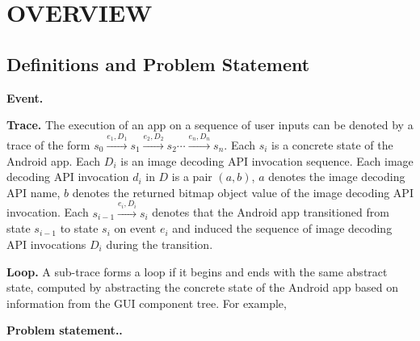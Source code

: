 \section{OVERVIEW}\label{sec:overview}

\subsection{Definitions and Problem Statement}

\noindent\textbf{Event.}

\noindent\textbf{Trace.}
The execution of an app on a sequence of user inputs can be denoted by a trace of the form
$s_0\xrightarrow{e_1, D_1}s_1\xrightarrow{e_2, D_2}s_2 \cdots\xrightarrow{e_n, D_n}s_n$.
Each $s_i$ is a concrete state of the Android app.
Each $D_i$ is an image decoding API invocation sequence. Each image decoding API invocation $d_i$ in $D$ is a pair $(a,b)$, $a$ denotes the image decoding API name, $b$ denotes the returned bitmap object value of the image decoding API invocation.
Each $s_{i-1}\xrightarrow{e_i, D_i}s_i$ denotes that the Android app transitioned from state $s_{i-1}$ to state $s_i$ on event $e_i$ and induced the sequence of image decoding API invocations $D_i$ during the transition.

\noindent\textbf{Loop.}
A sub-trace forms a loop if it begins and ends with the same abstract state, computed by abstracting the concrete state of the Android app based on information from the GUI component tree.
For example, 


\noindent\textbf{Problem statement..}







